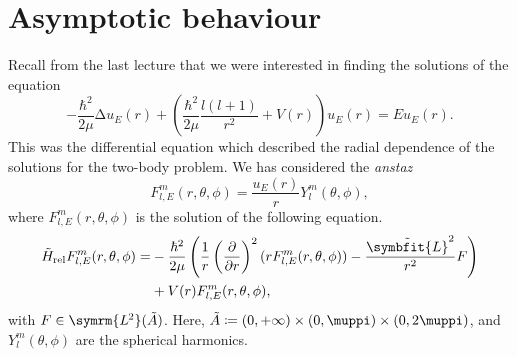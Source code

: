 \documentclass[a4 paper, 12pt]{article}
\theoremstyle{definition}
\newcommand{\ltwo}{\symrm{L\kern-0.5pt^2}}
\renewcommand{\pi}{\muppi}
\newcommand{\lap}{∆}
\newcommand{\lvecsquare}{\tilde{\symbfit{L}}^2}
\newcommand{\flme}{F^m_{l,E}}
\newcommand{\ltwoa}{\ltwo(\tilde{A})}
\newcommand{\sphe}{Y_l^m}
\begin{document}
    \section{Asymptotic behaviour}

    Recall from the last lecture that we were interested in finding the solutions of the equation 
    \[
        -\frac{\hbar^2}{2\mu} \lap u_E(r) + \left(\frac{\hbar^2}{2\mu} \frac{l(l+1)}{r^2} + V(r)\right) u_E (r) = E u_E (r).\tag{\textasteriskcentered}\label{eigen}
    \]
    This was the differential equation which described the radial dependence of the solutions for the two-body problem. We has considered the \textit{anstaz} 
    \[
        \flme(r, \theta, \phi) = \frac{u_E(r)}{r}\sphe(\theta, \phi),
    \]
    where \(\flme(r, \theta, \phi)\) is the solution of the following equation.
    \begin{align*}
        \tilde{H}_\text{rel} \flme(r, \theta, \phi) = &-\frac{\hbar^2}{2\mu}\left(\frac{1}{r}\left(\frac{\partial}{\partial r}\right)^2 (r\flme(r, \theta, \phi))- \frac{\lvecsquare}{r^2}F\right)\\
        &+ V(r)\flme(r, \theta, \phi),
    \end{align*}
    with \(F \in \ltwoa\). Here, \(\tilde{A} \coloneq (0, +\infty) \times (0,\pi) \times (0,2\pi)\), and \(\sphe(\theta, \phi)\) are the spherical harmonics.

    \nocite{*}
    \printbibliography[heading=bibintoc]
\end{document}
